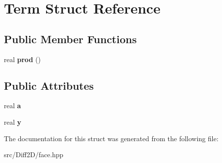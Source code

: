 \hypertarget{structTerm}{\section{Term Struct Reference}
\label{structTerm}
}
\subsection*{Public Member Functions}
\begin{DoxyCompactItemize}
\item 
\hypertarget{structTerm_a90008c143070b0544ea0a5de0dd0d651}{real {\bfseries prod} ()}\label{structTerm_a90008c143070b0544ea0a5de0dd0d651}

\end{DoxyCompactItemize}
\subsection*{Public Attributes}
\begin{DoxyCompactItemize}
\item 
\hypertarget{structTerm_a5b8e26faad37a4317ce722efbb2fb345}{real {\bfseries a}}\label{structTerm_a5b8e26faad37a4317ce722efbb2fb345}

\item 
\hypertarget{structTerm_adc6281bf7884d8b213aa98a701b4e578}{real {\bfseries y}}\label{structTerm_adc6281bf7884d8b213aa98a701b4e578}

\end{DoxyCompactItemize}


The documentation for this struct was generated from the following file\-:\begin{DoxyCompactItemize}
\item 
src/\-Diff2\-D/face.\-hpp\end{DoxyCompactItemize}
